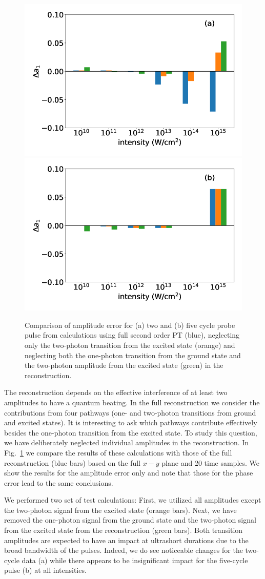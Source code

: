 \begin{figure}[!ht]
\centering
\includegraphics[width=0.49\linewidth]{figs/Photo_ionization/superpositions/Venzke_new_fig_5a.png}
\includegraphics[width=0.49\linewidth]{figs/Photo_ionization/superpositions/Venzke_new_fig_5b.png}
\caption{Comparison of amplitude error for (a) two  and (b) five cycle probe pulse from calculations using full second order PT (blue), neglecting only the two-photon transition from the excited state (orange) and neglecting both the one-photon transition from the ground state and the two-photon amplitude from the excited state (green) in the reconstruction. 
} 
  \label{fig:pathways}
\end{figure}

The reconstruction depends on the effective interference of at least two amplitudes to have a quantum beating. In the full reconstruction we consider the contributions from four pathways (one- and two-photon transitions from ground and excited states). It is interesting to ask which pathways contribute effectively besides the one-photon transition from the excited state. To study this question, we have deliberately neglected individual amplitudes in the reconstruction. In Fig.\ \ref{fig:pathways} we compare the results of these calculations with those of the full reconstruction (blue bars) based on the full $x-y$ plane and 20 time samples. We show the results for the amplitude error only and note that those for the phase error lead to the same conclusions.

We performed two set of test calculations: First, we utilized all amplitudes except the two-photon signal from the excited state (orange bars). Next, we have removed the one-photon signal from the ground state and the two-photon signal from the excited state from the reconstruction (green bars). Both transition amplitudes are expected to have an impact at ultrashort durations due to the broad bandwidth of the pulses. Indeed, we do see noticeable changes for the two-cycle data (a) while there appears to be insignificant impact for the five-cycle pulse (b) at all intensities.

